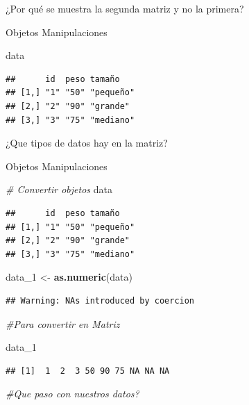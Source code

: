 \documentclass[
  ignorenonframetext,
]{beamer}
\newenvironment{Shaded}{\begin{snugshade}}{\end{snugshade}}
\newcommand{\CommentTok}[1]{\textcolor[rgb]{0.56,0.35,0.01}{\textit{#1}}}
\newcommand{\FunctionTok}[1]{\textcolor[rgb]{0.13,0.29,0.53}{\textbf{#1}}}
\newcommand{\NormalTok}[1]{#1}
\newcommand{\OtherTok}[1]{\textcolor[rgb]{0.56,0.35,0.01}{#1}}
\begin{document}
\begin{frame}[fragile]{¿Por qué se muestra la segunda matriz y no la
primera?}
\begin{block}{Objetos \textbar{} Manipulaciones}
\begin{Shaded}
\begin{Highlighting}[]
\NormalTok{data}
\end{Highlighting}
\end{Shaded}

\begin{verbatim}
##      id  peso tamaño   
## [1,] "1" "50" "pequeño"
## [2,] "2" "90" "grande" 
## [3,] "3" "75" "mediano"
\end{verbatim}

¿Que tipos de datos hay en la matriz?
\end{block}

\begin{block}{Objetos \textbar{} Manipulaciones}
\protect\hypertarget{objetos-manipulaciones-1}{}
\begin{Shaded}
\begin{Highlighting}[]
\CommentTok{\# Convertir objetos}
\NormalTok{data}
\end{Highlighting}
\end{Shaded}

\begin{verbatim}
##      id  peso tamaño   
## [1,] "1" "50" "pequeño"
## [2,] "2" "90" "grande" 
## [3,] "3" "75" "mediano"
\end{verbatim}

\begin{Shaded}
\begin{Highlighting}[]
\NormalTok{data\_1 }\OtherTok{\textless{}{-}} \FunctionTok{as.numeric}\NormalTok{(data) }
\end{Highlighting}
\end{Shaded}

\begin{verbatim}
## Warning: NAs introduced by coercion
\end{verbatim}

\begin{Shaded}
\begin{Highlighting}[]
\CommentTok{\#Para convertir en Matriz}

\NormalTok{data\_1 }
\end{Highlighting}
\end{Shaded}

\begin{verbatim}
## [1]  1  2  3 50 90 75 NA NA NA
\end{verbatim}

\begin{Shaded}
\begin{Highlighting}[]
\CommentTok{\#Que paso con nuestros datos? }
\end{Highlighting}
\end{Shaded}
\end{block}


\end{frame}
\end{document}

